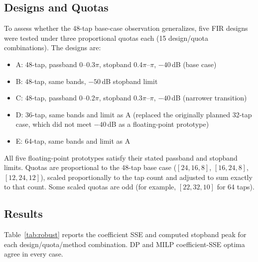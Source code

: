 
\subsection{Designs and Quotas}

To assess whether the 48-tap base-case observation generalizes, five
FIR designs were tested under three proportional quotas each (15
design/quota combinations). The designs are:

\begin{itemize}
\item A: 48-tap, passband 0--0.3$\pi$, stopband 0.4$\pi$--$\pi$,
$-40$\,dB (base case)
\item B: 48-tap, same bands, $-50$\,dB stopband limit
\item C: 48-tap, passband 0--0.2$\pi$, stopband 0.3$\pi$--$\pi$,
$-40$\,dB (narrower transition)
\item D: 36-tap, same bands and limit as A (replaced the originally
planned 32-tap case, which did not meet $-40$\,dB as a floating-point
prototype)
\item E: 64-tap, same bands and limit as A
\end{itemize}

All five floating-point prototypes satisfy their stated passband and
stopband limits. Quotas are proportional to the 48-tap base case
($[24,16,8]$, $[16,24,8]$, $[12,24,12]$), scaled proportionally to the
tap count and adjusted to sum exactly to that count. Some scaled quotas
are odd (for example, $[22,32,10]$ for 64 taps).

\subsection{Results}

Table~\ref{tab:robust} reports the coefficient SSE and computed stopband
peak for each design/quota/method combination. DP and MILP coefficient-SSE
optima agree in every case.

